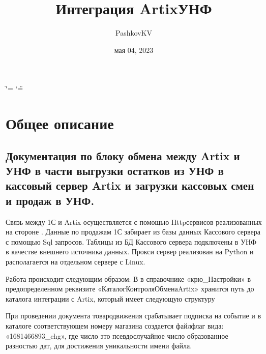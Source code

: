 \documentclass[letterpaper,10pt,russian]{sphinxmanual}
\title{Интеграция Artix\sphinxhyphen{}УНФ}
\date{мая 04, 2023}
\author{PashkovKV}
\begin{document}
\ifdefined\shorthandoff
  \ifnum\catcode`\=\string=\active\shorthandoff{=}\fi
  \ifnum\catcode`\"=\active{}\fi
\fi

\pagestyle{empty}
\sphinxmaketitle
\pagestyle{plain}
\sphinxtableofcontents
\pagestyle{normal}
\label{\detokenize{index::doc}}


\sphinxstepscope


\chapter{Общее описание}
\label{\detokenize{description:id1}}\label{\detokenize{description::doc}}

\section{Документация по блоку обмена между Artix и УНФ в части выгрузки остатков из УНФ в кассовый сервер Artix и загрузки кассовых смен и продаж в УНФ.}
\label{\detokenize{description:artix-artix}}
\sphinxAtStartPar
Связь между 1С и Artix осуществляется с помощью Http\sphinxhyphen{}сервисов реализованных на стороне . Данные по продажам 1С забирает из базы данных
Кассового сервера с помощью Sql запросов. Таблицы из БД Кассового сервера подключены в УНФ в качестве внешнего источника данных.
Прокси сервер реализован на Python и располагается на отдельном сервере с Linux.

\begin{figure}[htbp]
\centering

\noindent{}
\end{figure}

\sphinxAtStartPar
Работа происходит следующим образом:
В  в справочнике «крю\_Настройки» в предопределенном реквизите «КаталогКонтроляОбменаArtix» хранится путь до каталога интеграции
с Artix, который имеет следующую структуру \sphinxhyphen{}

\begin{figure}[htbp]
\centering

\noindent{}
\end{figure}

\sphinxAtStartPar
При проведении документа товародвижения срабатывает подписка на событие и в каталоге соответствующем номеру магазина создается файл\sphinxhyphen{}флаг
вида:  «1681466893\_chg», где число это псевдослучайное число образованное разностью дат, для достижения уникальности имени файла.
\end{document}
